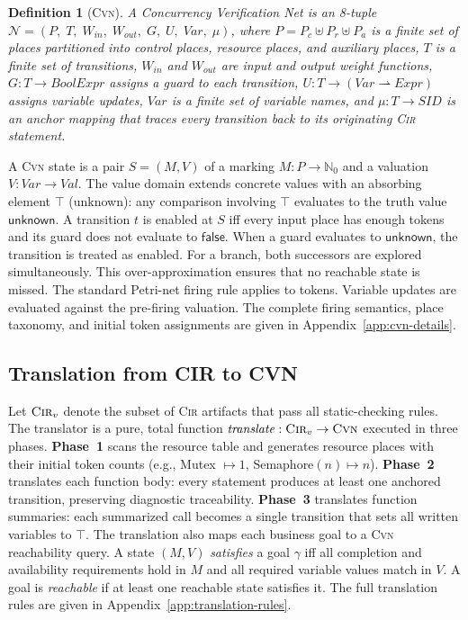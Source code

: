 \documentclass{article}
\newtheorem{definition}{Definition}
\begin{document}
\begin{definition}[\textsc{Cvn}]
\label{def:cvn}
A Concurrency Verification Net is an 8-tuple $\mathcal{N}=(P,\;T,\;W_{\!\mathit{in}},\;W_{\!\mathit{out}},\;G,\;U,\;\mathit{Var},\;\mu)$, where $P=P_c\uplus P_r\uplus P_a$ is a finite set of places partitioned into control places, resource places, and auxiliary places, $T$ is a finite set of transitions, $W_{\!\mathit{in}}$ and $W_{\!\mathit{out}}$ are input and output weight functions, $G:T\to\mathit{BoolExpr}$ assigns a guard to each transition, $U:T\to(\mathit{Var}\rightharpoonup\mathit{Expr})$ assigns variable updates, $\mathit{Var}$ is a finite set of variable names, and $\mu:T\to\mathit{SID}$ is an anchor mapping that traces every transition back to its originating \textsc{Cir} statement.
\end{definition}

A \textsc{Cvn} state is a pair $S=(M,V)$ of a marking $M:P\to\mathbb{N}_0$ and a valuation $V:\mathit{Var}\to\mathit{Val}$. The value domain extends concrete
values with an absorbing element $\top$ (unknown): any comparison involving $\top$ evaluates to the truth value $\mathsf{unknown}$. A transition $t$ is enabled at $S$ iff every input place has enough tokens and its guard does not evaluate to $\mathsf{false}$. When a guard evaluates to $\mathsf{unknown}$, the transition is treated as enabled.  For a branch, both successors are explored simultaneously. This over-approximation ensures that no reachable state is missed. The standard Petri-net firing rule applies to tokens. Variable updates are evaluated against the pre-firing valuation. The complete firing semantics, place taxonomy, and initial token assignments are given in Appendix~\ref{app:cvn-details}.

\subsection{Translation from CIR to CVN}
\label{subsec:translation}
Let $\textsc{Cir}_v$ denote the subset of \textsc{Cir} artifacts that pass all static-checking rules. The translator is a pure, total function $\mathit{translate}:\textsc{Cir}_v\to\textsc{Cvn}$ executed in three phases. \textbf{Phase~1} scans the resource table and generates resource places with their initial token counts (e.g., Mutex $\mapsto 1$, Semaphore$(n)\mapsto n$). \textbf{Phase~2} translates each function body: every statement produces at least one anchored transition, preserving diagnostic traceability. \textbf{Phase~3} translates function summaries: each summarized call becomes a single transition that sets all written variables to $\top$. The translation also maps each business goal to a \textsc{Cvn} reachability query. A state $(M,V)$ \emph{satisfies} a goal $\gamma$ iff all completion and availability requirements hold in $M$ and all required variable values match in $V$. A goal is \emph{reachable} if at least one reachable state satisfies it. The full translation rules are given in Appendix~\ref{app:translation-rules}.
\end{document}
